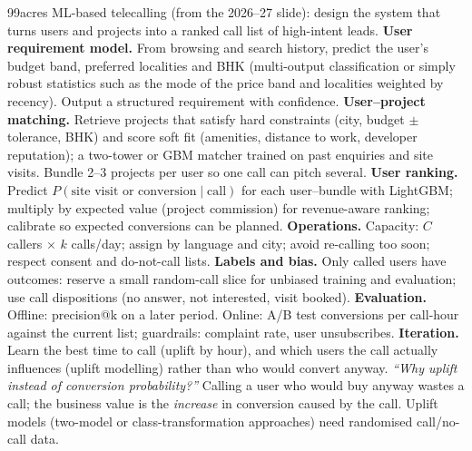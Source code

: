 \begin{qa}{\deep 99acres ML-based telecalling (from the 2026--27 slide): design the system that turns users and projects into a ranked call list of high-intent leads.}
\why
\textbf{User requirement model.} From browsing and search history, predict the user's budget band, preferred localities and BHK (multi-output classification or simply robust statistics such
as the mode of the price band and localities weighted by recency). Output a structured requirement with confidence.
\textbf{User--project matching.} Retrieve projects that satisfy hard constraints (city, budget $\pm$ tolerance, BHK) and score soft fit (amenities, distance to work, developer
reputation); a two-tower or GBM matcher trained on past enquiries and site visits. Bundle 2--3 projects per user so one call can pitch several.
\textbf{User ranking.} Predict $P(\text{site visit or conversion}\mid\text{call})$ for each user--bundle with LightGBM; multiply by expected value (project commission) for revenue-aware
ranking; calibrate so expected conversions can be planned.
\textbf{Operations.} Capacity: $C$ callers $\times$ $k$ calls/day; assign by language and city; avoid re-calling too soon; respect consent and do-not-call lists.
\textbf{Labels and bias.} Only called users have outcomes: reserve a small random-call slice for unbiased training and evaluation; use call dispositions (no answer, not interested, visit booked).
\textbf{Evaluation.} Offline: precision@k on a later period. Online: A/B test conversions per call-hour against the current list; guardrails: complaint rate, user unsubscribes.
\textbf{Iteration.} Learn the best time to call (uplift by hour), and which users the call actually influences (uplift modelling) rather than who would convert anyway.
\pushes \emph{``Why uplift instead of conversion probability?''} Calling a user who would buy anyway wastes a call; the business value is the \emph{increase} in conversion caused by the call.
Uplift models (two-model or class-transformation approaches) need randomised call/no-call data.
\end{qa}

